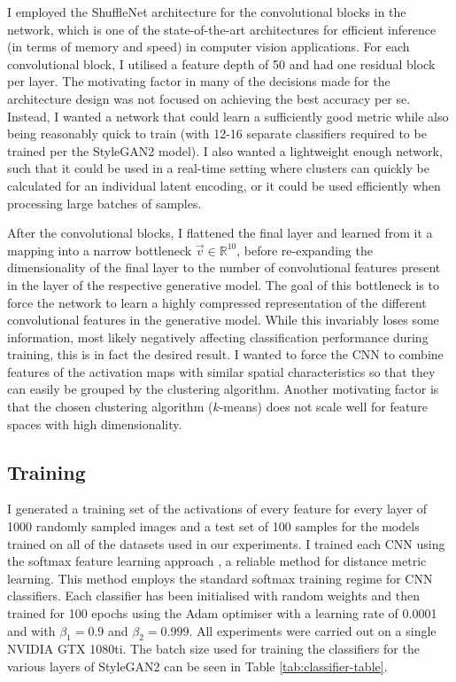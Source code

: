 I employed the ShuffleNet architecture \citep{zhang2018shufflenet} for the convolutional blocks in the network, which is one of the state-of-the-art architectures for efficient inference (in terms of memory and speed) in computer vision applications. 
For each convolutional block, I utilised a feature depth of 50 and had one residual block per layer. 
The motivating factor in many of the decisions made for the architecture design was not focused on achieving the best accuracy per se. 
Instead, I wanted a network that could learn a sufficiently good metric while also being reasonably quick to train (with 12-16 separate classifiers required to be trained per the StyleGAN2 model). 
I also wanted a lightweight enough network, such that it could be used in a real-time setting where clusters can quickly be calculated for an individual latent encoding, or it could be used efficiently when processing large batches of samples.

After the convolutional blocks, I flattened the final layer and learned from it a mapping into a narrow bottleneck $\vec{v} \in \mathbb{R}^{10}$, before re-expanding the dimensionality of the final layer to the number of convolutional features present in the layer of the respective generative model. 
The goal of this bottleneck is to force the network to learn a highly compressed representation of the different convolutional features in the generative model. 
While this invariably loses some information, most likely negatively affecting classification performance during training, this is in fact the desired result. 
I wanted to force the CNN to combine features of the activation maps with similar spatial characteristics so that they can easily be grouped by the clustering algorithm. 
Another motivating factor is that the chosen clustering algorithm ($k$-means) does not scale well for feature spaces with high dimensionality.

\subsection{Training}

I generated a training set of the activations of every feature for every layer of 1000 randomly sampled images and a test set of 100 samples for the models trained on all of the datasets used in our experiments. 
I trained each CNN using the softmax feature learning approach \citep{dosovitskiy2014discriminative}, a reliable method for distance metric learning. This method employs the standard softmax training regime \citep{bridle1990probabilistic} for CNN classifiers. 
Each classifier has been initialised with random weights and then trained for 100 epochs using the Adam optimiser \citep{kingma2015adam} with a learning rate of 0.0001 and with $\beta_1 = 0.9$ and $\beta_2 = 0.999$. 
All experiments were carried out on a single NVIDIA GTX 1080ti. The batch size used for training the classifiers for the various layers of StyleGAN2 can be seen in Table \ref{tab:classifier-table}. 

